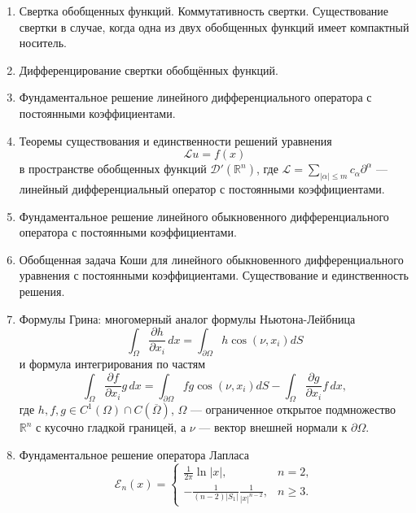 \documentclass[unicode,12pt,draft]{article}
\begin{document}
\begin{enumerate}
\item
Свертка обобщенных функций. Коммутативность свертки. Существование
свертки в случае, когда одна из двух обобщенных функций имеет
компактный носитель.

\item
Дифференцирование свертки обобщённых функций.


\item
Фундаментальное решение линейного дифференциального оператора с
постоянными коэффициентами.

\item
Теоремы существования и единственности решений уравнения
$$
    {\mathcal L}
    u
    =
    f (x)
$$
в пространстве обобщенных функций ${\mathcal D}' ({\mathbb R}^n)$,
где $
    {\mathcal L}
    =
    \sum_{
        |\alpha| \le m
    }
    c_\alpha
    \partial^\alpha
$
--- линейный дифференциальный оператор с постоянными коэффициентами.

\item
Фундаментальное решение линейного обыкновенного дифференциального
оператора с постоянными коэффициентами.

\item
Обобщенная задача Коши для линейного обыкновенного
дифференциального уравнения с постоянными коэффициентами.
Существование и единственность решения.

\item
Формулы Грина: многомерный аналог формулы Ньютона-Лейбница
$$
    \int_\Omega
    \frac{\partial h}{\partial x_i}
    \,
    dx
    =
    \int_{
        \partial \Omega
    }
    h
    \cos (\nu, x_i)
    dS
$$
и формула интегрирования по частям
$$
    \int_\Omega
    \frac{\partial f}{\partial x_i}
    g
    \,
    dx
    =
    \int_{
        \partial \Omega
    }
    fg
    \cos (\nu, x_i)
    dS
    -
    \int_\Omega
    \frac{\partial g}{\partial x_i}
    f
    \,
    dx,
$$
где $h,f,g \in C^1 (\Omega) \cap C (\overline \Omega)$, $\Omega$
--- ограниченное открытое подмножество ${\mathbb R}^n$ с кусочно
гладкой границей, а $\nu$ --- вектор внешней нормали к $\partial
\Omega$.

\item
Фундаментальное решение оператора Лапласа
$$
    {\mathcal E}_n (x)
    =
    \left\{
        \begin{array}{ll}
            \frac{1}{2 \pi}
            \ln |x|,
            &
            n = 2,
            \\
            - \frac{
                1
            }{
                (n - 2)
                |S_1|
            }
            \frac{
                1
            }{
                |x|^{n - 2}
            },
            &
            n \ge 3.
        \end{array}
    \right.
$$


\end{enumerate}
\end{document}
